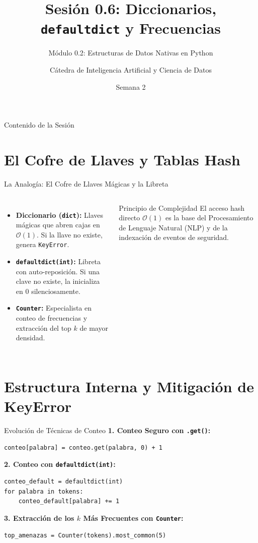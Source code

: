 \documentclass[aspectratio=169]{beamer}
\title[INT210 - Sesión 0.6]{Sesión 0.6: Diccionarios, \texttt{defaultdict} y Frecuencias}
\subtitle{Módulo 0.2: Estructuras de Datos Nativas en Python}
\author[Diplomado en Ciencia de Datos]{Cátedra de Inteligencia Artificial y Ciencia de Datos}
\institute[INT210]{Machine Learning From Scratch}
\date{Semana 2}
\begin{document}
\frame{\titlepage}

\begin{frame}{Contenido de la Sesión}
    \tableofcontents
\end{frame}

\section{El Cofre de Llaves y Tablas Hash}

\begin{frame}{La Analogía: El Cofre de Llaves Mágicas y la Libreta}
    \begin{columns}
        \begin{itemize}
            \item \textbf{Diccionario (\texttt{dict}):} Llaves mágicas que abren cajas en $\mathcal{O}(1)$. Si la llave no existe, genera \texttt{KeyError}.
            \item \textbf{\texttt{defaultdict(int)}:} Libreta con auto-reposición. Si una clave no existe, la inicializa en $0$ silenciosamente.
            \item \textbf{\texttt{Counter}:} Especialista en conteo de frecuencias y extracción del top $k$ de mayor densidad.
        \end{itemize}
        \begin{alertblock}{Principio de Complejidad}
            El acceso hash directo $\mathcal{O}(1)$ es la base del Procesamiento de Lenguaje Natural (NLP) y de la indexación de eventos de seguridad.
        \end{alertblock}
    \end{columns}
\end{frame}

\section{Estructura Interna y Mitigación de KeyError}

\begin{frame}[fragile]{Evolución de Técnicas de Conteo}
    \textbf{1. Conteo Seguro con \texttt{.get()}:}
\begin{lstlisting}
conteo[palabra] = conteo.get(palabra, 0) + 1
\end{lstlisting}
    \vspace{0.2cm}
    \textbf{2. Conteo con \texttt{defaultdict(int)}:}
\begin{lstlisting}
conteo_default = defaultdict(int)
for palabra in tokens:
    conteo_default[palabra] += 1
\end{lstlisting}
    \vspace{0.2cm}
    \textbf{3. Extracción de los $k$ Más Frecuentes con \texttt{Counter}:}
\begin{lstlisting}
top_amenazas = Counter(tokens).most_common(5)
\end{lstlisting}
\end{frame}
\end{document}
